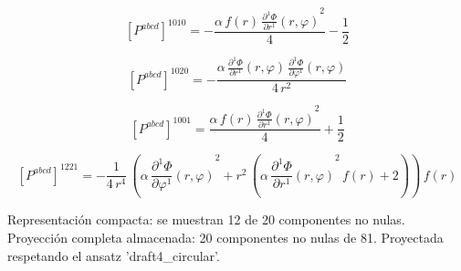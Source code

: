 \documentclass[11pt]{article}
\begin{document}
\begin{dmath*}[breakdepth={5}]
\left[P^{abcd}\right]^{1010} = -\frac{\alpha\,f\!\left(r\right)\,{\frac{\partial^{1} \Phi}{\partial r^{1}}\!\left(r, \varphi\right)}^{2}}{4} - \frac{1}{2}
\end{dmath*}
\par\smallskip
\begin{dmath*}[breakdepth={5}]
\left[P^{abcd}\right]^{1020} = -\frac{\alpha\,\frac{\partial^{1} \Phi}{\partial r^{1}}\!\left(r, \varphi\right)\,\frac{\partial^{1} \Phi}{\partial \varphi^{1}}\!\left(r, \varphi\right)}{4\,{r}^{2}}
\end{dmath*}
\par\smallskip
\begin{dmath*}[breakdepth={5}]
\left[P^{abcd}\right]^{1001} = \frac{\alpha\,f\!\left(r\right)\,{\frac{\partial^{1} \Phi}{\partial r^{1}}\!\left(r, \varphi\right)}^{2}}{4} + \frac{1}{2}
\end{dmath*}
\par\smallskip
\begin{dmath*}[breakdepth={5}]
\left[P^{abcd}\right]^{1221} = -\frac{1}{4\,{r}^{4}}\,\left(\alpha\,{\frac{\partial^{1} \Phi}{\partial \varphi^{1}}\!\left(r, \varphi\right)}^{2} + {r}^{2}\,\left(\alpha\,{\frac{\partial^{1} \Phi}{\partial r^{1}}\!\left(r, \varphi\right)}^{2}\,f\!\left(r\right) + 2\right)\right)\,f\!\left(r\right)
\end{dmath*}
\par\smallskip
Representación compacta: se muestran 12 de 20 componentes no nulas.
Proyección completa almacenada: 20 componentes no nulas de 81. Proyectada respetando el ansatz 'draft4\_circular'.\par\medskip
{}
\end{document}
